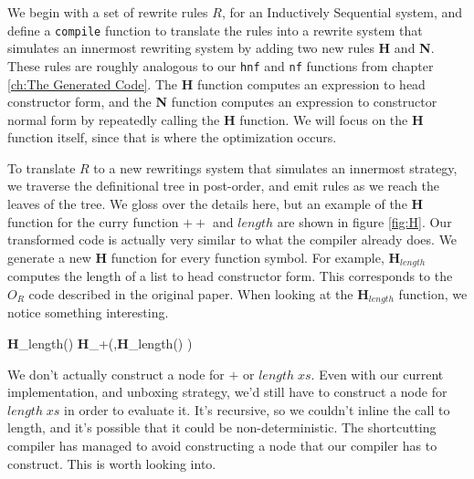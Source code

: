 \documentclass{book}
\theoremstyle{definition}
\newcommand{\Varid}[1]{\mathit{#1}}
\newcommand{\plus}{\mathbin{+\!\!\!+}}
\def\resethooks{%
  \global\let\SaveRestoreHook\empty
  \global\let\ColumnHook\empty}
\let\hspre\empty
\let\hspost\empty
\begin{document}
We begin with a set of rewrite rules $R$, for an Inductively Sequential system,
and define a \texttt{compile} function to translate the rules into
a rewrite system that simulates
an innermost rewriting system by adding two new rules \textbf{H} and \textbf{N}.
These rules are roughly analogous to our \texttt{hnf} and \texttt{nf} functions
from chapter \ref{ch:The Generated Code}.
The \textbf{H} function computes an expression to head constructor form,
and the \textbf{N} function computes an expression to constructor normal form
by repeatedly calling the \textbf{H} function.
We will focus on the \textbf{H} function itself, since that is where the optimization occurs.

To translate $R$ to a new rewritings system that simulates
an innermost strategy, we traverse the definitional tree in post-order,
and emit rules as we reach the leaves of the tree.
We gloss over the details here, but an example of the \textbf{H} function for the curry function \ensuremath{\plus } and \ensuremath{\Varid{length}}
are shown in figure \ref{fig:H}.
Our transformed code is actually very similar to what the compiler already does.
We generate a new \textbf{H} function for every function symbol.
For example, $\textbf{H}_{length}$ computes the length of a list to head constructor form.
This corresponds to the $O_R$ code described in the original paper.
When looking at the $\textbf{H}_{length}$ function, we notice something interesting.
\begin{hscode}\SaveRestoreHook
\column{B}{@{}>{\hspre}l<{\hspost}@{}}%
\column{3}{@{}>{\hspre}l<{\hspost}@{}}%
\column{E}{@{}>{\hspre}l<{\hspost}@{}}%
\>[3]{}\textbf{H}_{length}(\Varid{x}\mathbin{:}\Varid{xs}) \mathrel{=}\textbf{H}_{+}(,\textbf{H}_{length}(\Varid{xs}) ) {}\<[E]%
\ColumnHook
\end{hscode}\resethooks
We don't actually construct a node for $+$ or \ensuremath{\Varid{length}\;\Varid{xs}}.
Even with our current implementation, and unboxing strategy, we'd still have to construct
a node for \ensuremath{\Varid{length}\;\Varid{xs}} in order to evaluate it.
It's recursive, so we couldn't inline the call to length, and it's possible that
it could be non-deterministic.
The shortcutting compiler has managed to avoid constructing a node that our compiler has to construct.
This is worth looking into.
\end{document}
